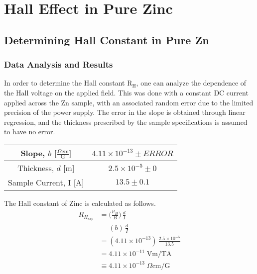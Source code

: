 \documentclass[a4paper]{article}
\begin{document}
\section{Hall Effect in Pure Zinc}

\subsection{Determining Hall Constant in Pure Zn}

\subsubsection{Data Analysis and Results}
\qq In order to determine the Hall constant $\text{R}_\text{H}$, one can
analyze the dependence of the Hall voltage on the applied field. This
was done with a constant DC current applied across the Zn sample, with
an associated random error due to the limited precision of the power
supply. The error in the slope is obtained through linear regression,
and the thickness prescribed by the sample specifications is assumed
to have no error.

\begin{center}
\begin{tabular}{|c|c|}
\hline
Slope, $b$ $\big[  \frac{\Omega \text{cm}}{\text{G}} \big] $ & $4.11 \times 10^{-13} \pm ERROR$ \topVspace \bottomVspace \\
\hline
Thickness, $d$ [m] & $2.5 \times 10^{-5} \pm 0$ \topVspace \bottomVspace \\
\hline
Sample Current, I [A] & $13.5 \pm 0.1$ \topVspace \bottomVspace \\
\hline
\end{tabular}
\label{table:zinc_RH}
\end{center}

The Hall constant of Zinc is calculated as follows.
\begin{align*}
R_{H_{exp}} &= \big( \frac{\mu_H}{B} \big) \, \frac{d}{I} \\
    &= (b) \, \frac{d}{I} \\
    &= (4.11 \times 10^{-13}) \, \frac{2.5 \times 10^{-5}}{13.5} \\
    &= 4.11 \times 10^{-11} \; \text{Vm/TA} \\
    &\equiv 4.11 \times 10^{-13} \; \Omega \text{cm/G} \\
\end{align*}
\end{document}
